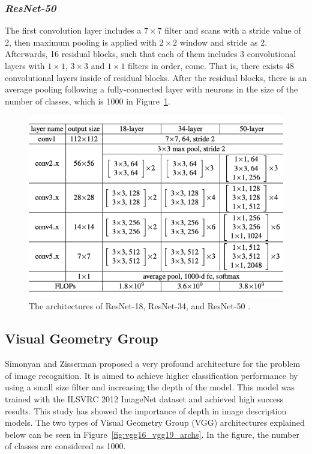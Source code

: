 \subsubsection*{\textit{ResNet-50}}

The first convolution layer includes a $7 \times 7$ filter and scans with a stride value of 2, then maximum pooling is applied with  $2 \times 2 $ window and stride as 2. Afterwards, 16 residual blocks, such that each of them includes 3 convolutional layers with $1 \times 1$, $3 \times 3$ and $1 \times 1$ filters in order, come. That is, there exists 48 convolutional layers inside of residual blocks. After the residual blocks, there is an average pooling following a fully-connected layer with neurons in the size of the number of classes, which is 1000 in Figure~\ref{fig:resnet_archs}.

\begin{figure}[h]
	\centering
	\includegraphics[width=\linewidth]{fig/resnet_archs.png}
	\vspace*{1mm}
	\caption{The architectures of ResNet-18, ResNet-34, and ResNet-50 \cite{ResNet}.}
	\label{fig:resnet_archs}
\end{figure}


\subsection{Visual Geometry Group}

Simonyan and Zisserman \cite{VGG} proposed a very profound architecture for the problem of image recognition. It is aimed to achieve higher classification performance by using a small size filter and increasing the depth of the model. This model was trained with the ILSVRC 2012  ImageNet \cite{imagenet} dataset and achieved high success results. This study has showed the importance of depth in image description models. The two types of Visual Geometry Group (VGG) architectures explained below can be seen in Figure~\ref{fig:vgg16_vgg19_archs}. In the figure, the number of classes are considered as 1000.

